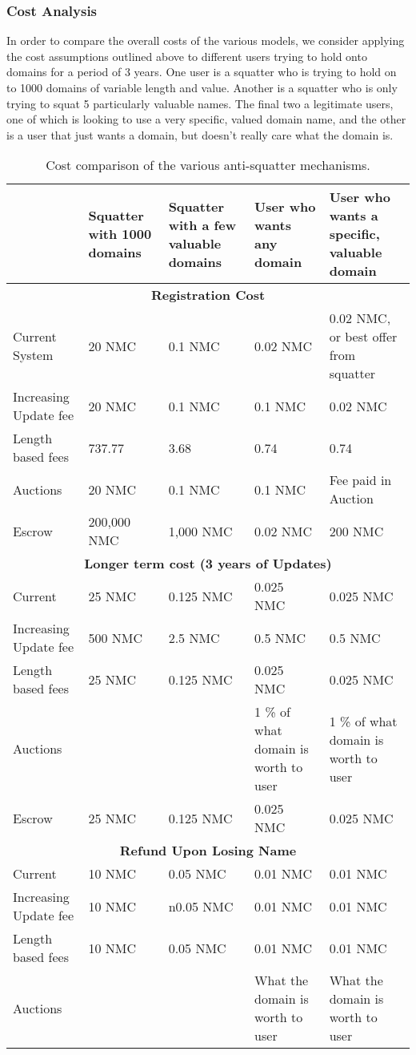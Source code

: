 \subsubsection{Cost Analysis}
    In order to compare the overall costs of the various models, we consider applying the cost assumptions outlined above to different users trying to hold onto domains for a period of 3 years. One user is a squatter who is trying to hold on to 1000 domains of variable length and value. Another is a squatter who is only trying to squat 5 particularly valuable names. The final two a legitimate users, one of which is looking to use a very specific, valued domain name, and the other is a user that just wants a domain, but doesn't really care what the domain is.


\begin{table*}[t]
  \centering
  \begin{tabularx}{\linewidth}{| X | X | X | X | X |} \hline
    &  Squatter with 1000 domains & Squatter with a few valuable domains & User who wants any domain & User who wants a specific, valuable domain\\
\hline
    \multicolumn{5}{|c|}{\textbf{Registration Cost}} \\ \hline
Current System &  20 NMC & 0.1 NMC & 0.02 NMC & 0.02 NMC, or best offer from squatter \\
Increasing Update fee & 20 NMC & 0.1 NMC & 0.1 NMC & 0.02 NMC \\
Length based fees & 737.77 & 3.68 & 0.74 & 0.74 \\ 
Auctions & 20 NMC & 0.1 NMC & 0.1 NMC & Fee paid in Auction \\
Escrow & 200,000 NMC & 1,000 NMC & 0.02 NMC & 200 NMC \\ \hline

\multicolumn{5}{|c|}{\textbf{Longer term cost (3 years of Updates)}} \\ \hline
Current & 25 NMC & 0.125 NMC & 0.025 NMC & 0.025 NMC \\ 
Increasing Update fee & 500 NMC & 2.5 NMC & 0.5 NMC & 0.5 NMC \\ 
Length based fees & 25 NMC & 0.125 NMC & 0.025 NMC & 0.025 NMC \\ 
Auctions & & & 1 \% of what domain is worth to user & 1 \% of what domain is worth to user \\ 
Escrow & 25 NMC & 0.125 NMC & 0.025 NMC & 0.025 NMC \\ \hline

\multicolumn{5}{|c|}{\textbf{Refund Upon Losing Name}} \\ \hline
Current & 10 NMC & 0.05 NMC & 0.01 NMC & 0.01 NMC \\
Increasing Update fee & 10 NMC & n0.05 NMC & 0.01 NMC & 0.01 NMC \\
Length based fees & 10 NMC & 0.05 NMC & 0.01 NMC & 0.01 NMC \\
Auctions & & & What the domain is worth to user & What the domain is worth to user \\ \hline
  \end{tabularx}
  \caption{Cost comparison of the various anti-squatter mechanisms.}
\end{table*}


